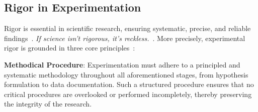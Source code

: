 \subsection{Rigor in Experimentation}
\label{subsec:rigor}

Rigor is essential in scientific research, ensuring systematic, precise, and reliable findings~\cite{rigor2}. \textit{If science isn’t rigorous, it’s reckless.}~\cite{rigor1}. More precisely, experimental rigor is grounded in three core principles~\cite{rigor3}:


\noindent\textbf{Methodical Procedure}: 
Experimentation must adhere to a principled and systematic methodology throughout all aforementioned stages, from hypothesis formulation to data documentation. 
Such a structured procedure ensures that no critical procedures are overlooked or performed incompletely, thereby preserving the integrity of the research.

